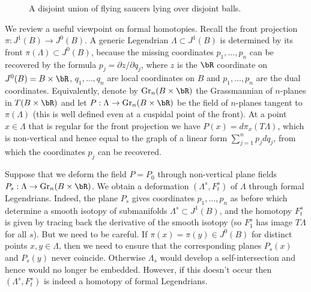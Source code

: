 \begin{figure}[htbp]
\begin{center}
\caption{\smaller A disjoint union of flying saucers lying over disjoint balls.}
\label{FigureDisjointUnion}
\end{center}
\end{figure}

We review a useful viewpoint on formal homotopies. Recall the front projection $\pi:J^1(B) \to J^0(B)$. A generic Legendrian $\Lambda \subset J^1(B)$ is determined by its front $\pi(\Lambda) \subset J^0(B)$, because the missing coordinates $p_1, \ldots, p_n$ can be recovered by the formula $p_j = \partial z / \partial q_j$, where $z$ is the $\bR$ coordinate on $J^0(B)=B \times \bR$, $q_1, \ldots, q_n$ are local coordinates on $B$ and $p_1, \ldots, p_n$ are the dual coordinates. Equivalently, denote by $\text{Gr}_n(B \times \bR)$ the Grassmannian of $n$-planes in $T(B \times \bR)$ and let $P: \Lambda \to \text{Gr}_n(B \times \bR)$ be the field of $n$-planes tangent to $\pi(\Lambda)$ (this is well defined even at a cuspidal point of the front). At a point $x \in \Lambda$ that is regular for the front projection we have $P(x)=d\pi_x(T \Lambda)$, which is non-vertical and hence equal to the graph of a linear form $\sum_{j=1}^n p_j dq_j$, from which the coordinates $p_j$ can be recovered.

Suppose that we deform the field $P=P_0$ through non-vertical plane fields \hbox{$P_s:\Lambda \to \text{Gr}_n(B \times \bR)$}. We obtain a deformation $(\Lambda^s,F_t^s)$ of $\Lambda$ through formal Legendrians. Indeed, the plane $P_s$ gives coordinates $p_1, \ldots, p_n$ as before which determine a smooth isotopy of submanifolds $\Lambda^s \subset J^1(B)$, and the homotopy $F^s_t$ is given by tracing back the derivative of the smooth isotopy (so $F^s_1$ has image $T \Lambda$ for all $s$). But we need to be careful. If $\pi(x)=\pi(y) \in J^0(B)$ for distinct points $x,y \in \Lambda$, then we need to ensure that the corresponding planes $P_s(x)$ and $P_s(y)$ never coincide. Otherwise $\Lambda_s$ would develop a self-intersection and hence would no longer be embedded. However, if this doesn't occur then $(\Lambda^s,F^s_t)$ is indeed a homotopy of formal Legendrians. 

